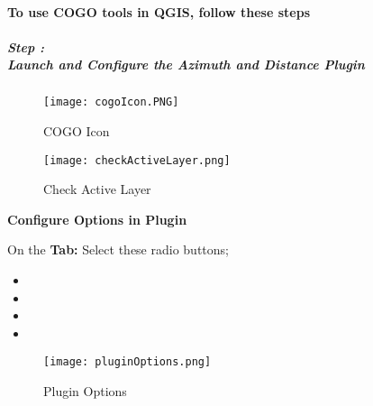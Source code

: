 \clearpage
\paragraph{To use COGO tools in QGIS, follow these steps}
\vspace{.2in}


\subparagraph*{{\LARGE Step \thestepCount:}\\Launch and Configure the Azimuth and Distance Plugin}


\begin{figure}[H]
\centering
     \texttt{[image: cogoIcon.PNG]}
\vspace{-.2in}

\caption{COGO Icon}
\end{figure}

\vspace{.1in}


\begin{figure}[H] %
\centering
    \texttt{[image: checkActiveLayer.png]}
\vspace{-.3in}

\caption{Check Active Layer}
\end{figure}
\clearpage
\noindent\textbf{Configure Options in Plugin}
\vspace{.2in}

\large On the \textbf{ Tab:} Select these radio buttons;
\begin{itemize}
\item {}
\item {}
\item {}
\item {}
\end{itemize}
\begin{figure}[H]
\centering
    \texttt{[image: pluginOptions.png]}
\vspace{-.2in}

\caption{Plugin Options}
\end{figure}
\clearpage

